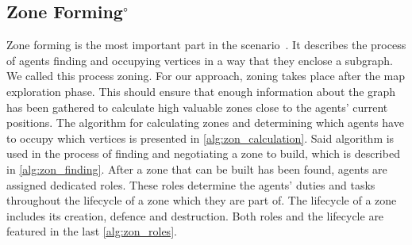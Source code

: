 \subsection[Zone Forming]{Zone Forming$^\circ$}\label{alg:zoning}
Zone forming is the most important part in the \mars scenario~\cite{ahlbrecht_mapc_2014}.%
It describes the process of agents finding and occupying vertices in a way that they enclose a subgraph.
We called this process zoning.
For our approach, zoning takes place after the map exploration phase.
This should ensure that enough information about the graph has been gathered to calculate high valuable zones close to the agents' current positions.
The algorithm for calculating zones and determining which agents have to occupy which vertices is presented in \autoref{alg:zon_calculation}.
Said algorithm is used in the process of finding and negotiating a zone to build, which is described in \autoref{alg:zon_finding}.
After a zone that can be built has been found, agents are assigned dedicated roles.
These roles determine the agents' duties and tasks throughout the lifecycle of a zone which they are part of.
The lifecycle of a zone includes its creation, defence and destruction.
Both roles and the lifecycle are featured in the last \autoref{alg:zon_roles}.




